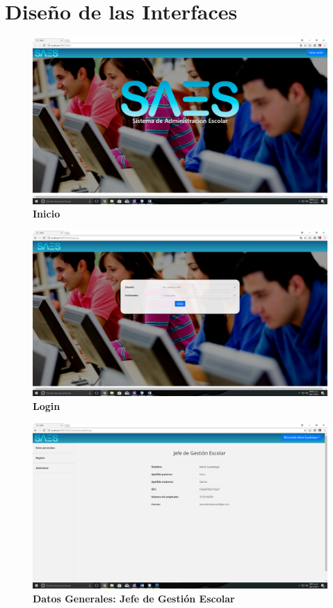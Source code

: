 \chapter{Diseño de las Interfaces}
\begin{figure}[H]
  \centering
    \includegraphics[scale=0.2]{project/images/1.png}
  \caption{\textbf{Inicio}}
\end{figure}
\begin{figure}[H]
  \centering
    \includegraphics[scale=0.2]{project/images/2.png}
  \caption{\textbf{Login}}
\end{figure}
\begin{figure}[H]
  \centering
    \includegraphics[scale=0.2]{project/images/15.png}
  \caption{\textbf{Datos Generales: Jefe de Gestión Escolar}}
\end{figure}
